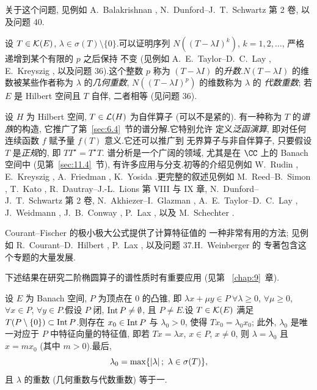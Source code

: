 关于这个问题, 见例如 A.~Balakrishnan , N.~Dunford--J.~T.~Schwartz  第 2 卷, 以及问题 40.

设 $T\in\mathcal{K}(E)$, $\lambda\in\sigma(T)\setminus\{0\}$.可以证明序列
$N((T-\lambda I)^k)$, $k=1,2,\dots$, 严格递增到某个有限的 $p$ 之后保持
不变 (见例如 A.~E.~Taylor--D.~C.~Lay , E.~Kreyszig , 以及问题 36).这个整数 $p$ 称为
$(T-\lambda I)$ 的\emph{升数}.$N(T-\lambda I)$ 的维数被某些作者称为
$\lambda$ 的\emph{几何重数}, $N((T-\lambda I)^p)$ 的维数称为 $\lambda$ 的
\emph{代数重数}; 若 $E$ 是 Hilbert 空间且 $T$ 自伴, 二者相等 (见问题 36).

设 $H$ 为 Hilbert 空间, $T\in\mathcal{L}(H)$ 为自伴算子 (可以不是紧的).
有一种称为 $T$ 的\emph{谱族}的构造, 它推广了第~\ref{sec:6.4}~节的谱分解.它特别允许
定义\emph{泛函演算}, 即对任何连续函数 $f$ 赋予量 $f(T)$ 意义.它还可以推广到
无界算子与非自伴算子, 只要假设 $T$ 是\emph{正规}的, 即 $TT^\star=T^\star T$.
谱分析是一个广阔的领域, 尤其是在 $\CC$ 上的 Banach 空间中 (见第~\ref{sec:11.4}~节),
有许多应用与分支.初等的介绍见例如 W.~Rudin , E.~Kreyszig , A.~Friedman , K.~Yosida .更完整的叙述见例如 M.~Reed--B.~Simon
, T.~Kato , R.~Dautray--J.-L.~Lions  第 VIII 与 IX 章, N.~Dunford--J.~T.~Schwartz  第 2 卷, N.~Akhiezer--I.~Glazman , A.~E.~Taylor--D.~C.~Lay , J.~Weidmann , J.~B.~Conway , P.~Lax , 以及
M.~Schechter .

 Courant--Fischer 的极小极大公式提供了计算特征值的
一种非常有用的方法; 见例如 R.~Courant--D.~Hilbert , P.~Lax , 以及问题 37.H.~Weinberger  的
专著包含这个专题的大量发展.

下述结果在研究二阶椭圆算子的谱性质时有重要应用 (见第~
\ref{chap:9}~章).

\begin{startheorem}
\label{thm:6.13}
设 $E$ 为 Banach 空间, $P$ 为顶点在 $0$ 的凸锥, 即
$\lambda x+\mu y\in P\ \forall\lambda\ge0$, $\forall\mu\ge0$,
$\forall x\in P$, $\forall y\in P$.假设 $P$ 闭, $\operatorname{Int} P\ne\emptyset$,
且 $P\ne E$.设 $T\in\mathcal{K}(E)$ 满足 $T(P\setminus\{0\})\subset\operatorname{Int} P$.则存在
$x_0\in\operatorname{Int} P$ 与 $\lambda_0>0$, 使得 $Tx_0=\lambda_0x_0$; 此外, $\lambda_0$
是唯一对应于 $P$ 中特征向量的特征值, 即若 $Tx=\lambda x$, $x\in P$,
$x\ne0$, 则 $\lambda=\lambda_0$ 且 $x=mx_0$ (其中 $m>0$).最后,
\begin{equation*}
\lambda_0=\max\{\abs{\lambda};\ \lambda\in\sigma(T)\},
\end{equation*}
且 $\lambda$ 的重数 (几何重数与代数重数) 等于一.
\end{startheorem}

